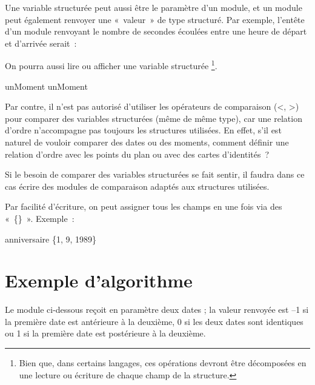 	Une variable structurée peut aussi être le paramètre d’un module, 
	et un module peut également renvoyer une «~valeur~» de type structuré. 
	Par exemple, l’entête d’un module renvoyant le nombre de secondes 
	écoulées entre une heure de départ et d’arrivée serait~:

	\begin{Pseudocode}
	\end{Pseudocode}

	On pourra aussi lire ou afficher une variable structurée%
	\footnote{%
		Bien que, dans certains langages, 
		ces opérations devront être décomposées en une lecture ou
		écriture de chaque champ de la structure.
	}.

	\begin{Pseudocode}
	\Read unMoment
	\Write unMoment
	\end{Pseudocode}

	Par contre, il n’est pas autorisé d’utiliser
	les opérateurs de comparaison ({\textless}, {\textgreater}) 
	pour comparer des variables structurées (même de même type), 
	car une relation d’ordre n’accompagne pas toujours les structures utilisées. 
	En effet, s’il est naturel de vouloir comparer des dates ou des moments,
	comment définir une relation d’ordre avec les points du plan ou avec
	des cartes d’identités~?

	Si le besoin de comparer des variables structurées se fait sentir, 
	il faudra dans ce cas écrire 
	des modules de comparaison adaptés aux structures utilisées.

	Par facilité d’écriture, 
	on peut assigner tous les champs en une fois via des «~\{\}~». 
	Exemple~:

	\begin{Pseudocode}
	\Let anniversaire \Gets \{1, 9, 1989\}
	\end{Pseudocode}

\section{Exemple d’algorithme}

	Le module ci-dessous reçoit en paramètre deux dates ; 
	la valeur renvoyée est 
	–1 si la première date est antérieure à la deuxième, 
	0 si les deux dates sont identiques 
	ou 1 si la première date est postérieure à la deuxième.

